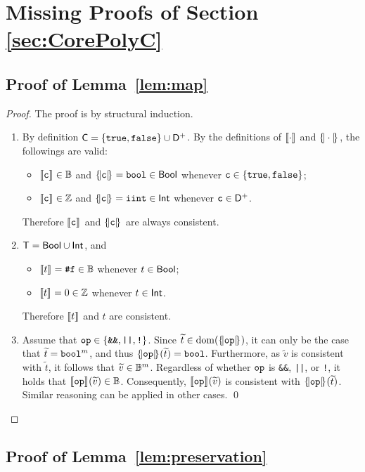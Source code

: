 \documentclass[runningheads]{llncs}
\begin{document}
\section{Missing Proofs of Section \ref{sec:CorePolyC}}
\subsection{Proof of Lemma~\ref{lem:map}}
\begin{proof}
The proof is by structural induction. 
\begin{enumerate}
    \item By definition $\mathsf{C}=\{\texttt{true},\texttt{false}\}\cup\mathsf{D}^{+}$.
By the definitions of $\llbracket\cdot\rrbracket_{}$ and $\{\!|\cdot|\!\}_{}$, the followings are valid:
    \begin{itemize}
        \item $\llbracket\mathtt{c}\rrbracket_{}\in\mathbb{B}$ and $\{\!|\mathtt{c}|\!\}_{}=\mathtt{bool}\in\mathsf{Bool}$ whenever $\mathtt{c}\in\{\texttt{true},\texttt{false}\}$;
        \item $\llbracket\mathtt{c}\rrbracket_{}\in\mathbb{Z}$ and $\{\!|\mathtt{c}|\!\}_{}=\mathtt{iint}\in\mathsf{Int}$ whenever $\mathtt{c}\in \mathsf{D}^{+}$.
    \end{itemize}
    Therefore $\llbracket\mathtt{c}\rrbracket_{}$ and $\{\!|\mathtt{c}|\!\}_{}$ are always consistent.
    \item $\mathsf{T}=\mathsf{Bool}\cup\mathsf{Int}$, and
    \begin{itemize}
        \item $\llbracket t\rrbracket_{}=\texttt{\#}\mathtt{f}\in\mathbb{B}$ whenever $t\in\mathsf{Bool}$;
        \item $\llbracket t\rrbracket_{}=0\in\mathbb{Z}$ whenever $t\in\mathsf{Int}$.
    \end{itemize}
Therefore $\llbracket t\rrbracket_{}$ and $t$ are consistent.
    \item Assume that $\mathtt{op}\in\{\texttt{\&\&},\texttt{||},\texttt{!}\}$.
    Since $\widetilde{t}\in\mathrm{dom}(\{\!|\mathtt{op}|\!\}_{})$, it can only be the case that $\widetilde{t}=\mathtt{bool}^m$, and thus $\{\!|\mathtt{op}|\!\}_{}(\widetilde{t})=\mathtt{bool}$. Furthermore, as $\widetilde{v}$ is consistent with $\widetilde{t}$, it follows that $\widetilde{v}\in\mathbb{B}^m$.
    Regardless of whether $\mathtt{op}$ is \texttt{\&\&}, \texttt{||}, or \texttt{!}, it holds that $\llbracket\mathtt{op}\rrbracket_{}(\widetilde{v})\in\mathbb{B}$.
    Consequently, $\llbracket\mathtt{op}\rrbracket_{}(\widetilde{v})$ is consistent with $\{\!|\mathtt{op}|\!\}_{}(\widetilde{t})$.
    Similar reasoning can be applied in other cases.
    \qed
\end{enumerate}
\end{proof}
\subsection{Proof of Lemma~\ref{lem:preservation}}
\end{document}
